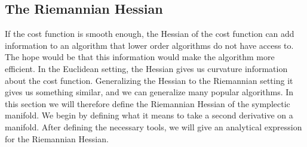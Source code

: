 \subsection{The Riemannian Hessian}\label{sec:riemannian_hessian}
If the cost function is smooth enough, the Hessian of the cost function can add information to an algorithm that lower order algorithms do not have access to. The hope would be that this information would make the algorithm more efficient. In the Euclidean setting, the Hessian gives us curvature information about the cost function. Generalizing the Hessian to the Riemannian setting it gives us something similar, and we can generalize many popular algorithms. In this section we will therefore define the Riemannian Hessian of the symplectic manifold. We begin by defining what it means to take a second derivative on a manifold. After defining the necessary tools, we will give an analytical expression for the Riemannian Hessian. 


